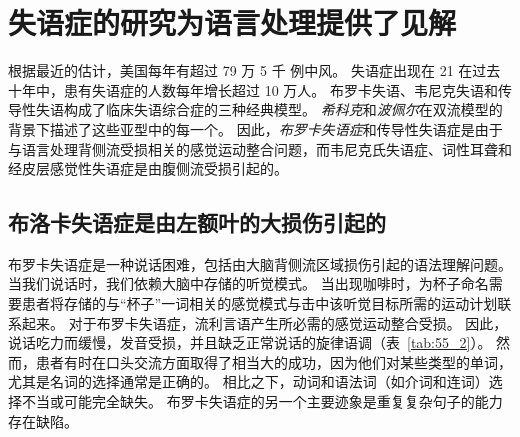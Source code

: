 \section{失语症的研究为语言处理提供了见解}

根据最近的估计，美国每年有超过 79 万 5 千 例中风。
失语症出现在 21%
在过去十年中，患有失语症的人数每年增长超过 10 万人。
布罗卡失语、韦尼克失语和传导性失语构成了临床失语综合症的三种经典模型。
\textit{希科克}和\textit{波佩尔}在双流模型的背景下描述了这些亚型中的每一个。
因此，\textit{布罗卡失语症}和传导性失语症是由于与语言处理背侧流受损相关的感觉运动整合问题，而韦尼克氏失语症、词性耳聋和经皮层感觉性失语症是由腹侧流受损引起的。



\subsection{布洛卡失语症是由左额叶的大损伤引起的}

布罗卡失语症是一种说话困难，包括由大脑背侧流区域损伤引起的语法理解问题。
当我们说话时，我们依赖大脑中存储的听觉模式。
当出现咖啡时，为杯子命名需要患者将存储的与“杯子”一词相关的感觉模式与击中该听觉目标所需的运动计划联系起来。
对于布罗卡失语症，流利言语产生所必需的感觉运动整合受损。
因此，说话吃力而缓慢，发音受损，并且缺乏正常说话的旋律语调（表~\ref{tab:55_2}）。
然而，患者有时在口头交流方面取得了相当大的成功，因为他们对某些类型的单词，尤其是名词的选择通常是正确的。
相比之下，动词和语法词（如介词和连词）选择不当或可能完全缺失。
布罗卡失语症的另一个主要迹象是重复复杂句子的能力存在缺陷。


